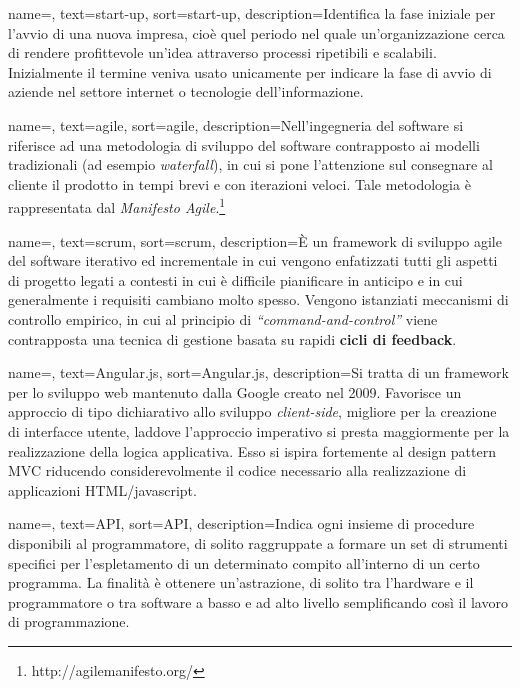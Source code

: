 {
    name=,
    text=start-up,
    sort=start-up,
    description={Identifica la fase iniziale per l'avvio di una nuova impresa, cioè quel periodo nel quale un'organizzazione cerca di rendere profittevole un'idea attraverso processi ripetibili e scalabili. Inizialmente il termine veniva usato unicamente per indicare la fase di avvio di aziende nel settore internet o tecnologie dell'informazione.}
}

{
    name=,
    text=agile,
    sort=agile,
    description={Nell'ingegneria del software si riferisce ad una metodologia di sviluppo del software contrapposto ai modelli tradizionali (ad esempio \textit{waterfall}), in cui si pone l'attenzione sul consegnare al cliente il prodotto in tempi brevi e con iterazioni veloci. Tale metodologia è rappresentata dal \textit{Manifesto Agile}.\footnote{http://agilemanifesto.org/}}
}

{
    name=,
    text=scrum,
    sort=scrum,
    description={È un framework di sviluppo agile del software iterativo ed incrementale in cui vengono enfatizzati tutti gli aspetti di progetto legati a contesti in cui è difficile pianificare in anticipo e in cui generalmente i requisiti cambiano molto spesso. Vengono istanziati meccanismi di controllo empirico, in cui al principio di \textit{``command-and-control''} viene contrapposta una tecnica di gestione basata su rapidi \textbf{cicli di feedback}.}
}

{
    name=,
    text=Angular.js,
    sort=Angular.js,
    description={Si tratta di un framework per lo sviluppo web mantenuto dalla Google creato nel 2009. Favorisce un approccio di tipo dichiarativo allo sviluppo \textit{client-side}, migliore per la creazione di interfacce utente, laddove l'approccio imperativo si presta maggiormente per la realizzazione della logica applicativa. Esso si ispira fortemente al design pattern MVC riducendo considerevolmente il codice necessario alla realizzazione di applicazioni HTML/javascript.}
}

{
    name=,
    text=API,
    sort=API,
    description={Indica ogni insieme di procedure disponibili al programmatore, di solito raggruppate a formare un set di strumenti specifici per l’espletamento di un determinato compito all’interno di un certo programma. La finalità è ottenere un’astrazione, di solito tra l’hardware e il programmatore o tra software a basso e ad alto livello semplificando così il lavoro di programmazione.}
}

